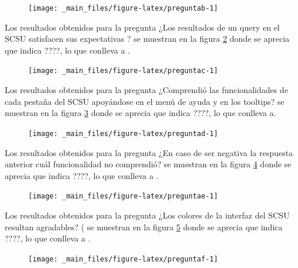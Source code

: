 \documentclass[
  12pt,
  openany]{book}
\begin{document}
\begin{figure}

{\centering \texttt{[image: \_main\_files/figure-latex/preguntab-1]} 

}

\caption{ }\label{fig:preguntab}
\end{figure}

Los resultados obtenidos para la pregunta ¿Los resultados de un query en el SCSU satisfacen sus expectativas ? se muestran en la figura \ref{fig:preguntac} donde se aprecia que indica ????, lo que conlleva a .

\begin{figure}

{\centering \texttt{[image: \_main\_files/figure-latex/preguntac-1]} 

}

\caption{ }\label{fig:preguntac}
\end{figure}

Los resultados obtenidos para la pregunta ¿Comprendió las funcionalidades de cada pestaña del SCSU apoyándose en el menú de ayuda y en los tooltips? se muestran en la figura \ref{fig:preguntad} donde se aprecia que indica ????, lo que conlleva a.

\begin{figure}

{\centering \texttt{[image: \_main\_files/figure-latex/preguntad-1]} 

}

\caption{ }\label{fig:preguntad}
\end{figure}

Los resultados obtenidos para la pregunta ¿En caso de ser negativa la respuesta anterior cuál funcionalidad no comprendió? se muestran en la figura \ref{fig:preguntae} donde se aprecia que indica ????, lo que conlleva a .

\begin{figure}

{\centering \texttt{[image: \_main\_files/figure-latex/preguntae-1]} 

}

\caption{ }\label{fig:preguntae}
\end{figure}

Los resultados obtenidos para la pregunta ¿Los colores de la interfaz del SCSU resultan agradables? ( se muestran en la figura \ref{fig:preguntaf} donde se aprecia que indica ????, lo que conlleva a .

\begin{figure}

{\centering \texttt{[image: \_main\_files/figure-latex/preguntaf-1]} 

}

\caption{ }\label{fig:preguntaf}
\end{figure}
\end{document}
